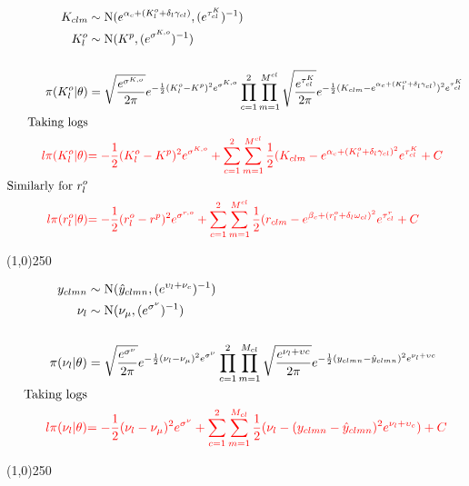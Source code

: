\begin{align*}
K_{clm} &\sim \operatorname{N}(e^{\alpha_{c}+(K_{l}^o+\delta_{l}\gamma_{cl})},(e^{ \tau_{cl}^K })^{-1})\\
K_{l}^o &\sim \operatorname{N}(K^p, (e^{ \sigma^{K,o} })^{-1} )\\
\\
\pi(K_{l}^o |\theta)&=\sqrt{\frac{e^{ \sigma^{K,o} }}{2\pi}} e^{-\frac{1}{2}(K_{l}^o-K^p)^{2}e^{ \sigma^{K,o} } }
\prod_{c=1}^{2}\prod_{m=1}^{M^{cl}}\sqrt{\frac{e^{ \tau_{cl}^K }}{2\pi}} e^{-\frac{1}{2}(K_{clm}-e^{\alpha_{c}+(K_{l}^o+\delta_{l}\gamma_{cl})})^{2}e^{ \tau_{cl}^K } }\\
\text{Taking logs}\\
\color{red}{l\pi(K_{l}^o |\theta)}&
\color{red}{
=-\frac{1}{2}(K_{l}^o-K^p)^{2}e^{ \sigma^{K,o} } 
+
\sum_{c=1}^{2}\sum_{m=1}^{M^{cl}}\frac{1}{2}(K_{clm}-e^{\alpha_{c}+(K_{l}^o+\delta_{l}\gamma_{cl})^{2}}e^{\tau_{cl}^K}
+C}\\
\text{Similarly for $r_{l}^o$}\\
\color{red}{l\pi(r_{l}^o |\theta)}&
\color{red}{
=-\frac{1}{2}(r_{l}^o-r^p)^{2}e^{ \sigma^{r,o} } 
+
\sum_{c=1}^{2}\sum_{m=1}^{M^{cl}}\frac{1}{2}(r_{clm}-e^{\beta_{c}+(r_{l}^o+\delta_{l}\omega_{cl})^{2}}e^{\tau_{cl}^r}
+C}
\end{align*}

\begin{center}
\line(1,0){250}
\end{center}

\begin{align*}
y_{clmn} &\sim \operatorname{N}(\hat{y}_{clmn},(e^{ \upsilon_{l}+\nu_{c}  })^{-1} ) \\
\nu_{l} &\sim \operatorname{N}(\nu_{\mu},(e^{ \sigma^{\nu} })^{-1})\\
\\
\pi(\nu_{l}|\theta)&=\sqrt{\frac{e^{ \sigma^{\nu} }}{2\pi}} e^{-\frac{1}{2}(\nu_{l}-\nu_{\mu})^{2}e^{ \sigma^{\nu} } }
\prod_{c=1}^{2}\prod_{m=1}^{M_{cl}}\sqrt{\frac{e^{ \nu_{l}+\upsilon{c} }}{2\pi}} e^{-\frac{1}{2}(y_{clmn}-\hat{y}_{clmn})^{2}e^{ \nu_{l}+\upsilon{c} } }\\
\text{Taking logs}\\
\color{red}{l\pi(\nu_{l}|\theta)}&
\color{red}{
=-\frac{1}{2}(\nu_{l}-\nu_{\mu})^{2}e^{ \sigma^{\nu} } 
+
\sum_{c=1}^{2}\sum_{m=1}^{M_{cl}}\frac{1}{2}(\nu_{l}-(y_{clmn}-\hat{y}_{clmn})^{2}e^{ \nu_{l} +\upsilon_{c} })
+C}
\end{align*}

\begin{center}
\line(1,0){250}
\end{center}


